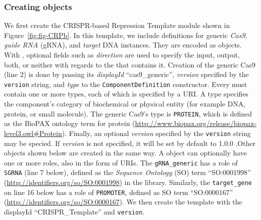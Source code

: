 \subsubsection*{Creating  objects}
We first create the CRISPR-based Repression Template module shown in
Figure~\ref{fig:fig-CRPb}. In this template, we include definitions
for generic \emph{Cas9}, \emph{guide RNA} (gRNA), and \emph{target}
DNA  instances. They are encoded as
 objects. With , optional fields such as \emph{direction} are used to specify the input, output, both, or neither with regards to the  that contains it. Creation of the generic Cas9 (line 2)  is done by passing its \emph{displayId}
``cas9\_generic'', \emph{version} specified by the \lstinline+version+
string, and \emph{type} to the \lstinline+ComponentDefinition+
constructor. Every  must contain one or more
types, each of which is specified by a URI. A type specifies the
component's category of biochemical or physical entity (for example
DNA, protein, or small molecule). The generic Cas9's type is
\lstinline+PROTEIN+, which is defined as the BioPAX ontology term for
protein (\url{http://www.biopax.org/release/biopax-level3.owl\#Protein}).  Finally, an optional \emph{version} specified by the \lstinline+version+ string may be specied. If \emph{version} is not specified, it will be set by default to 1.0.0
.Other  objects shown below are created in the same
way. A  object can optionally have one or
more roles, also in the form of URIs. The \lstinline+gRNA_generic+ has
a role of \lstinline+SGRNA+ (line 7 below), defined as the
\emph{Sequence Ontology} (SO) term ``SO:0001998''
(\url{http://identifiers.org/so/SO:0001998}) in the
library. Similarly, the \lstinline+target_gene+ on line 16 below has a role of
\lstinline+PROMOTER+, defined as SO term ``SO:0000167''
(\url{http://identifiers.org/so/SO:0000167}). We then create the  template with the displayId ``CRISPR\_Template'' and \lstinline+version+. 

